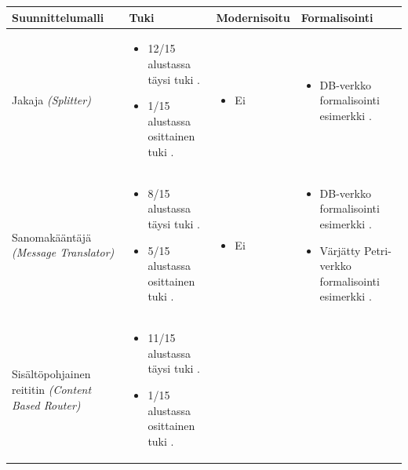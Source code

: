 \begin{table}[h]
\centering
    \begin{tabular}{|p{}|p{}|p{}|p{}|}
    \hline
    Suunnittelumalli & Tuki & Modernisoitu & Formalisointi \\ \hline
    Jakaja \textit{(Splitter)} &
        \begin{itemize}
            \item 12/15 alustassa täysi tuki \citep{Ritter2017}.
            \item 1/15 alustassa osittainen tuki \citep{Ritter2017}.
        \end{itemize}
      &
        \begin{itemize}
            \item Ei
        \end{itemize}
      &
        \begin{itemize}
           \item DB-verkko formalisointi esimerkki \citep{Ritter2021}.
        \end{itemize}
    \\ \hline
    Sanomakääntäjä \textit{(Message Translator)} & 
        \begin{itemize}
            \item 8/15 alustassa täysi tuki \citep{Ritter2017}.
            \item 5/15 alustassa osittainen tuki \citep{Ritter2017}.
        \end{itemize}
      &
        \begin{itemize}
            \item Ei
        \end{itemize}
      &  
        \begin{itemize}
           \item DB-verkko formalisointi esimerkki \citep{Ritter2021}.
           \item Värjätty Petri-verkko formalisointi esimerkki \citep{Fahland2013}.
        \end{itemize}
      \\ \hline
    Sisältöpohjainen reititin \textit{(Content Based Router)} & 
        \begin{itemize}
            \item 11/15 alustassa täysi tuki \citep{Ritter2017}.
            \item 1/15 alustassa osittainen tuki \citep{Ritter2017}.
        \end{itemize}

\end{tabular}
\end{table}
